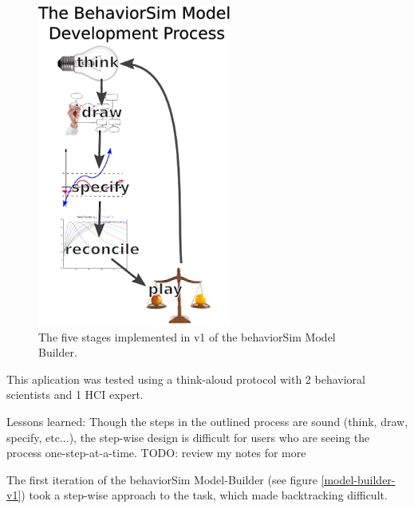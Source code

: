 \documentclass[conference]{IEEEtran}
\begin{document}
\begin{figure}[!t]
  \centering
  \includegraphics[width=0.9\columnwidth]{img/behaviorSim_process}  
  \caption{The five stages implemented in v1 of the behaviorSim Model Builder.}
  \label{model-builder-tutorial}
\end{figure}

This aplication was tested using a think-aloud protocol with 2 behavioral scientists and 1 HCI expert. 

Lessons learned:
  Though the steps in the outlined process are sound (think, draw, specify, etc...), the step-wise design is difficult for users who are seeing the process one-step-at-a-time.
  TODO: review my notes for more
  
The first iteration of the behaviorSim Model-Builder (see figure \ref{model-builder-v1}) took a step-wise approach to the task, which made backtracking difficult.
\end{document}
